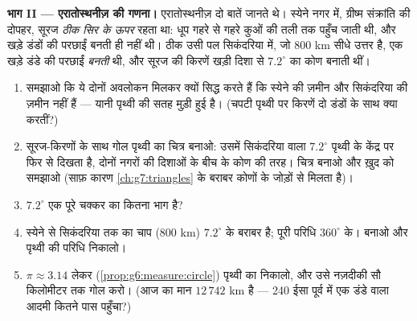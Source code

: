 \begin{problem}
\medskip
\noindent\textbf{भाग II --- एरातोस्थनीज़ की गणना।}
एरातोस्थनीज़ दो बातें जानते थे। स्येने नगर में, ग्रीष्म संक्रांति
की दोपहर, सूरज \emph{ठीक सिर के ऊपर} रहता था: धूप गहरे से गहरे
कुओं की तली तक पहुँच जाती थी, और खड़े डंडों की परछाईं बनती ही नहीं
थी। ठीक उसी पल सिकंदरिया में, जो $800$ km सीधे उत्तर है, एक खड़े
डंडे की परछाईं \emph{बनती} थी, और सूरज की किरणें खड़ी दिशा से
$7.2^\circ$ का कोण बनाती थीं।
\begin{enumerate}[resume]
  \item समझाओ कि ये दोनों अवलोकन मिलकर क्यों सिद्ध करते हैं कि
        स्येने की ज़मीन और सिकंदरिया की ज़मीन  नहीं हैं ---
        यानी पृथ्वी की सतह मुड़ी हुई है। (चपटी पृथ्वी पर 
        किरणें दो डंडों के साथ क्या करतीं?)
  \item {} सूरज-किरणों के साथ गोल पृथ्वी का चित्र बनाओ: उसमें
        सिकंदरिया वाला $7.2^\circ$ पृथ्वी के केंद्र पर फिर से
        दिखता है, दोनों नगरों की दिशाओं के बीच के कोण की तरह।
        चित्र बनाओ और ख़ुद को समझाओ (साफ़ कारण
        \cref{ch:g7:triangles} के बराबर कोणों के जोड़ों से मिलता
        है)।
  \item $7.2^\circ$ एक पूरे चक्कर का कितना भाग है?
  \item स्येने से सिकंदरिया तक का चाप ($800$ km) $7.2^\circ$ के
        बराबर है; पूरी परिधि $360^\circ$ के।  बनाओ और
        पृथ्वी की परिधि निकालो।
  \item $\pi \approx 3.14$ लेकर (\cref{prop:g6:measure:circle})
        पृथ्वी का  निकालो, और उसे नज़दीकी सौ किलोमीटर तक गोल
        करो। (आज का मान $12\,742$ km है --- 240 ईसा पूर्व में एक
        डंडे वाला आदमी कितने पास पहुँचा?)
\end{enumerate}


\end{problem}
